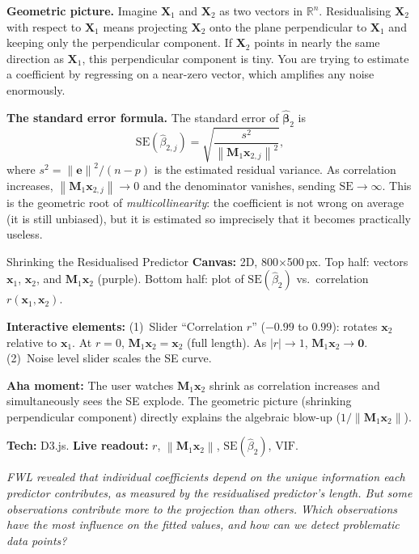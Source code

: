 \documentclass[11pt,a4paper]{article}
\theoremstyle{plain}
\theoremstyle{definition}
\newcommand{\R}{\mathbb{R}}
\newcommand{\bhat}{\hat{\bm{\beta}}}
\newcommand{\bX}{\bm{X}}
\newcommand{\be}{\bm{e}}
\newcommand{\bM}{\bm{M}}
\newcommand{\norm}[1]{\left\lVert #1 \right\rVert}
\begin{document}
\medskip
\noindent\textbf{Geometric picture.}
Imagine $\bX_1$ and $\bX_2$ as two vectors in $\R^n$.
Residualising $\bX_2$ with respect to $\bX_1$ means projecting $\bX_2$ onto the plane perpendicular to $\bX_1$ and keeping only the perpendicular component.
If $\bX_2$ points in nearly the same direction as $\bX_1$, this perpendicular component is tiny.
You are trying to estimate a coefficient by regressing on a near-zero vector, which amplifies any noise enormously.

\medskip
\noindent\textbf{The standard error formula.}
The standard error of $\bhat_2$ is
\[
  \text{SE}(\hat{\beta}_{2,j})
  = \sqrt{\frac{s^2}{\norm{\bM_1\bm{x}_{2,j}}^2}},
\]
where $s^2 = \norm{\be}^2/(n-p)$ is the estimated residual variance.
As correlation increases, $\norm{\bM_1\bm{x}_{2,j}}\to 0$ and the denominator vanishes,
sending $\text{SE}\to\infty$.
This is the geometric root of \emph{multicollinearity}: the coefficient is not wrong on average (it is still unbiased), but it is estimated so imprecisely that it becomes practically useless.

\begin{vizspec}{Shrinking the Residualised Predictor}
\textbf{Canvas:} 2D, 800$\times$500\,px.
Top half: vectors $\bm{x}_1$, $\bm{x}_2$, and $\bM_1\bm{x}_2$
(\textcolor{constraint}{purple}).
Bottom half: plot of $\text{SE}(\hat\beta_2)$ vs.\ correlation
$r(\bm{x}_1, \bm{x}_2)$.

\textbf{Interactive elements:}
(1)~Slider ``Correlation $r$'' ($-0.99$ to $0.99$): rotates $\bm{x}_2$
relative to $\bm{x}_1$.  At $r=0$, $\bM_1\bm{x}_2 = \bm{x}_2$
(full length).  As $|r| \to 1$, $\bM_1\bm{x}_2 \to \bm{0}$.
(2)~Noise level slider scales the SE curve.

\textbf{Aha moment:} The user watches $\bM_1\bm{x}_2$ shrink as
correlation increases and simultaneously sees the SE explode.
The geometric picture (shrinking perpendicular component) directly
explains the algebraic blow-up ($1/\norm{\bM_1\bm{x}_2}$).

\textbf{Tech:} D3.js.
\quad \textbf{Live readout:} $r$, $\norm{\bM_1\bm{x}_2}$,
$\text{SE}(\hat\beta_2)$, $\text{VIF}$.
\end{vizspec}

\medskip
\noindent\textit{FWL revealed that individual coefficients depend on
the unique information each predictor contributes, as measured by
the residualised predictor's length.
But some observations contribute more to the projection than others.
Which observations have the most influence on the fitted values,
and how can we detect problematic data points?}
\end{document}
